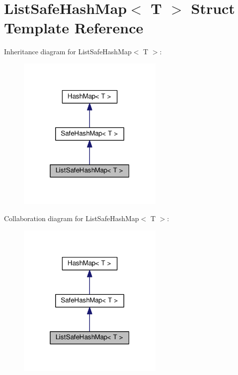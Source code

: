 \hypertarget{structListSafeHashMap}{}\section{List\+Safe\+Hash\+Map$<$ T $>$ Struct Template Reference}
\label{structListSafeHashMap}


Inheritance diagram for List\+Safe\+Hash\+Map$<$ T $>$\+:
\nopagebreak
\begin{figure}[H]
\begin{center}
\leavevmode
\includegraphics[width=199pt]{structListSafeHashMap__inherit__graph}
\end{center}
\end{figure}


Collaboration diagram for List\+Safe\+Hash\+Map$<$ T $>$\+:
\nopagebreak
\begin{figure}[H]
\begin{center}
\leavevmode
\includegraphics[width=199pt]{structListSafeHashMap__coll__graph}
\end{center}
\end{figure}
